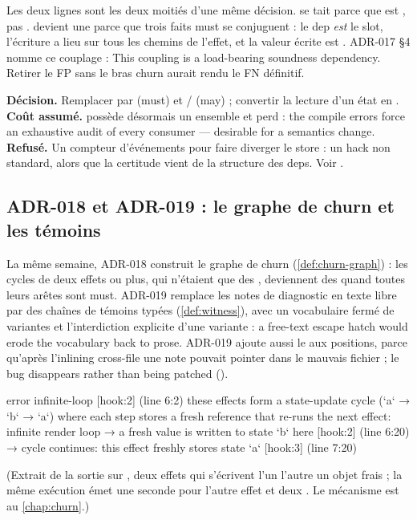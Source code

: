 Les deux lignes sont les deux moitiés d'une même décision.  se tait parce que  est , pas .  devient une \Error{} parce que trois faits must se conjuguent : le dep \emph{est} le slot, l'écriture a lieu sur tous les chemins de l'effet, et la valeur écrite est . ADR-017 §4 nomme ce couplage : \og This coupling is a load-bearing soundness dependency\fg{}. Retirer le FP sans le bras churn aurait rendu le FN définitif.

\begin{decision}
\textbf{Décision.} Remplacer  par  (must) et / (may) ; convertir la lecture d'un état en . \textbf{Coût assumé.}  possède désormais un ensemble et perd  : \og the compile errors force an exhaustive audit of every consumer --- desirable for a semantics change\fg{}. \textbf{Refusé.} Un compteur d'événements pour faire diverger le store : un hack non standard, alors que la certitude vient de la structure des deps. Voir .
\end{decision}

\subsection{ADR-018 et ADR-019 : le graphe de churn et les témoins}

La même semaine, ADR-018 construit le graphe de churn (\cref{def:churn-graph}) : les cycles de deux effets ou plus, qui n'étaient que des \Info, deviennent des \Error{} quand toutes leurs arêtes sont must. ADR-019 remplace les notes de diagnostic en texte libre par des chaînes de témoins typées (\cref{def:witness}), avec un vocabulaire fermé de variantes  et l'interdiction explicite d'une variante  : \og a free-text escape hatch would erode the vocabulary back to prose\fg{}. ADR-019 ajoute aussi le  aux positions, parce qu'après l'inlining cross-file une note pouvait pointer dans le mauvais fichier ; le bug \og disappears rather than being patched\fg{} ().

\begin{sortie}
    error  infinite-loop  [hook:2]  (line 6:2)  these effects form a state-update cycle (`a` → `b` → `a`) where each step stores a fresh reference that re-runs the next effect: infinite render loop
       → a fresh value is written to state `b` here [hook:2] (line 6:20)
       → cycle continues: this effect freshly stores state `a` [hook:3] (line 7:20)
\end{sortie}
\noindent(Extrait de la sortie sur , deux effets qui s'écrivent l'un l'autre un objet frais ; la même exécution émet une seconde \Error{} pour l'autre effet et deux \Warning{} . Le mécanisme est au \cref{chap:churn}.)

